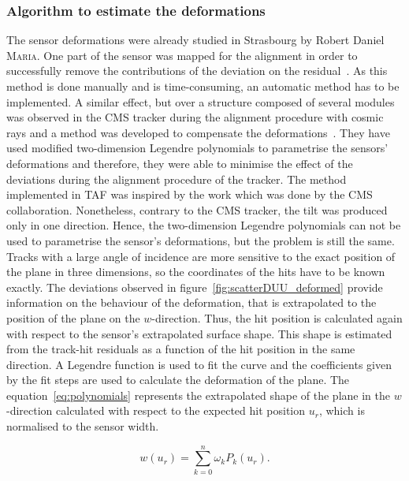       \subsubsection{Algorithm to estimate the deformations}

      The sensor deformations were already studied in Strasbourg by Robert Daniel \textsc{Maria}.
      One part of the sensor was mapped for the alignment in order to successfully remove the contributions of the deviation on the residual~\cite{maria}.
      As this method is done manually and is time-consuming, an automatic method has to be implemented.
      A similar effect, but over a structure composed of several modules was observed in the CMS tracker during the alignment procedure with cosmic rays and a method was developed to compensate the deformations~\cite{CMSalignment}. 
      They have used modified two-dimension Legendre polynomials to parametrise the sensors' deformations and therefore, they were able to minimise the effect of the deviations during the alignment procedure of the tracker.
      The method implemented in \gls{TAF} was inspired by the work which was done by the CMS collaboration.
      Nonetheless, contrary to the CMS tracker, the tilt was produced only in one direction.
      Hence, the two-dimension Legendre polynomials can not be used to parametrise the sensor's deformations, but the problem is still the same.
      Tracks with a large angle of incidence are more sensitive to the exact position of the plane in three dimensions, so the coordinates of the hits have to be known exactly.
      The deviations observed in figure~\ref{fig:scatterDUU_deformed} provide information on the behaviour of the deformation, that is extrapolated to the position of the plane on the $w$-direction.
      Thus, the hit position is calculated again with respect to the sensor's extrapolated surface shape.
      This shape is estimated from the track-hit residuals as a function of the hit position in the same direction.
      A Legendre function is used to fit the curve and the coefficients given by the fit steps are used to calculate the deformation of the plane.
      The equation~\ref{eq:polynomials} represents the extrapolated shape of the plane in the $w$-direction calculated with respect to the expected hit position $u_{r}$, which is normalised to the sensor width.

      \begin{equation}
        w\left(u_{r}\right) = \sum_{k=0}^n \omega_{k}P_{k}\left(u_{r}\right).
        \label{eq:polynomials}
      \end{equation}
      
